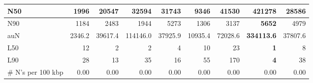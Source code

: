 \documentclass[12pt,a4paper]{article}
\begin{document}
\begin{table}[ht]
\begin{center}
\begin{tabular}{|l*{8}{|r}|}
N50 & 1996 & 20547 & 32594 & 31743 & 9346 & 41530 & {\bf 421278} & 28586 \\ \hline
N90 & 1184 & 2483 & 1944 & 5273 & 1306 & 3137 & {\bf 5652} & 4979 \\ \hline
auN & 2346.2 & 39617.4 & 114146.0 & 37925.9 & 10935.4 & 72028.6 & {\bf 334113.6} & 37807.6 \\ \hline
L50 & 12 & 2 & 2 & 4 & 10 & 23 & {\bf 1} & 8 \\ \hline
L90 & 28 & 13 & 35 & 16 & 55 & 170 & {\bf 4} & 38 \\ \hline
\# N's per 100 kbp & 0.00 & 0.00 & 0.00 & 0.00 & 0.00 & 0.00 & 0.00 & 0.00 \\ \hline
\end{tabular}
\end{center}
\end{table}
\end{document}
